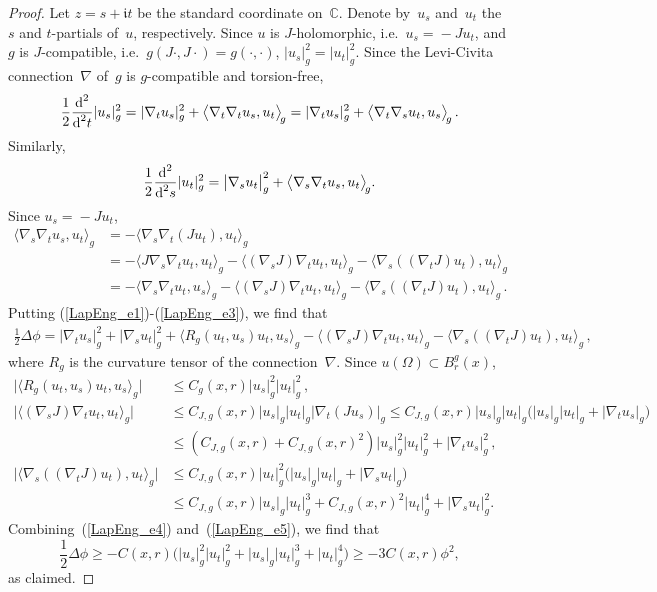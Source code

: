 \documentclass[11pt]{article}
\numberwithin{equation}{section}
\theoremstyle{definition}
\def\BE#1{\begin{equation}\label{#1}}
\def\EE{\end{equation}}
\def\eref#1{(\ref{#1})}
\def\lr#1{\langle#1\rangle}
\def\blr#1{\big\langle#1\big\rangle}
\def\C{\mathbb{C}}
\def\fI{\mathfrak i}
\def\na{\nabla}
\def\De{\Delta}
\def\Om{\Omega}
\def\nd{\textnormal{d}}
\begin{document}
\begin{proof}
Let $z\!=\!s\!+\!\fI t$ be the standard coordinate on~$\C$. 
Denote by~$u_s$ and~$u_t$ the $s$ and $t$-partials of~$u$, respectively.
Since $u$ is $J$-holomorphic, i.e.~$u_s\!=\!-Ju_t$, and $g$ is $J$-compatible,
i.e.~$g(J\cdot,J\cdot)\!=\!g(\cdot,\cdot)$, $|u_s|_g^2\!=\!|u_t|_g^2$.
Since the Levi-Civita connection~$\na$ of~$g$ is $g$-compatible and torsion-free,
\BE{LapEng_e1}
\frac12 \frac{\nd^2}{\nd^2 t}|u_s|_g^2= |\na_tu_s|_g^2+\blr{\na_t\na_tu_s,u_t}_{\!g}
=|\na_tu_s|_g^2+\blr{\na_t\na_su_t,u_s}_{\!g}\,.\EE
Similarly,
\BE{LapEng_e2}
\frac12 \frac{\nd^2}{\nd^2 s}|u_t|_g^2
=\big|\na_su_t\big|_g^2+\blr{\na_s\na_t u_s,u_t}_{\!g}.\EE
Since $u_s\!=\!-Ju_t$, 
\BE{LapEng_e3}\begin{split}
\lr{\na_s\na_t u_s,u_t}_{\!g}&=-\blr{\na_s\na_t (Ju_t),u_t}_{\!g}\\
&=-\blr{J\na_s\na_t u_t,u_t}_{\!g} -\blr{(\na_sJ)\na_t u_t,u_t}_{\!g}
-\blr{\na_s((\na_tJ)u_t),u_t}_{\!g}\\
&=-\blr{\na_s\na_t u_t,u_s}_{\!g} -\blr{(\na_sJ)\na_t u_t,u_t}_{\!g}
-\blr{\na_s((\na_tJ)u_t),u_t}_{\!g}\,.
\end{split}\EE
Putting \eref{LapEng_e1}-\eref{LapEng_e3}, we find that 
\BE{LapEng_e4}\begin{split}
\frac12\De\phi = \big|\na_tu_s\big|_g^2+\big|\na_su_t\big|_g^2+ 
\blr{R_g(u_t,u_s)u_t,u_s}_{\!g}
-\blr{(\na_sJ)\na_t u_t,u_t}_{\!g} -\blr{\na_s((\na_tJ)u_t),u_t}_{\!g}\,,
\end{split}\EE
where $R_g$ is the curvature tensor of the connection~$\na$.
Since $u(\Om)\!\subset\!B_r^g(x)$,
\BE{LapEng_e5}\begin{aligned}
\big|\lr{R_g(u_t,u_s)u_t,u_s}_g\big|&\le C_g(x,r)|u_s|_g^2|u_t|_g^2\,,\\
\big|\lr{(\na_sJ)\na_t u_t,u_t}_g\big|&\le  C_{J,g}(x,r)|u_s|_g|u_t|_g\big|\na_t(Ju_s)\big|_g 
\le C_{J,g}(x,r)|u_s|_g|u_t|_g\big(|u_s|_g|u_t|_g\!+\!|\na_tu_s|_g\big)\\
&\le (C_{J,g}(x,r)\!+\!C_{J,g}(x,r)^2)|u_s|_g^2|u_t|_g^2+|\na_tu_s|_g^2\,,\\
\big|\lr{\na_s((\na_tJ)u_t),u_t}_g\big|
&\le C_{J,g}(x,r)|u_t|_g^2\big(|u_s|_g|u_t|_g\!+\!|\na_su_t|_g\big)\\
&\le C_{J,g}(x,r)|u_s|_g|u_t|_g^3+C_{J,g}(x,r)^2|u_t|_g^4+|\na_su_t|_g^2.
\end{aligned}\EE
Combining~\eref{LapEng_e4} and~\eref{LapEng_e5}, we find that 
$$\frac12\De\phi \ge -C(x,r)\big(|u_s|_g^2|u_t|_g^2\!+\!|u_s|_g|u_t|_g^3\!+\!|u_t|_g^4\big)
\ge -3C(x,r)\phi^2,$$
as claimed.
\end{proof}
\end{document}
